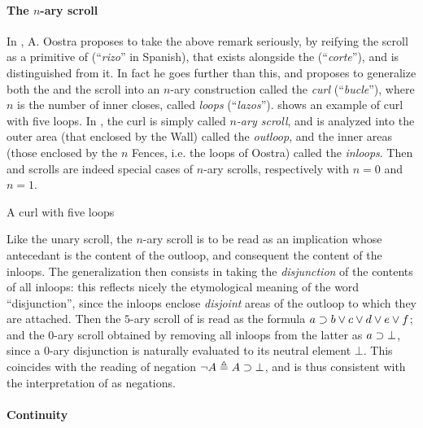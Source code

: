 \paragraph{The $n$-ary scroll}

In \cite{oostra_graficos_2010}, A. Oostra proposes to take the above remark
seriously, by reifying the scroll as a primitive  of  (``\emph{rizo}'' in
Spanish), that exists alongside the  (``\emph{corte}''), and is distinguished
from it. In fact he goes further than this, and proposes to generalize both the
 and the scroll into an $n$-ary construction called the \emph{curl}
(``\emph{bucle}''), where $n$ is the number of inner closes, called \emph{loops}
(``\emph{lazos}'').  shows an example of curl with five
loops. In \cite{minghui_graphical_2019}, the curl is simply called \emph{$n$-ary
scroll}, and is analyzed into the outer area (that enclosed by the Wall) called
the \emph{outloop}, and the inner areas (those enclosed by the $n$ Fences, i.e.
the loops of Oostra) called the \emph{inloops}. Then  and scrolls are indeed
special cases of $n$-ary scrolls, respectively with $n = 0$ and $n = 1$.

\begin{marginfigure}
  \caption{A curl with five loops}
\end{marginfigure}

Like the unary scroll, the $n$-ary scroll is to be read as an implication whose
antecedant is the content of the outloop, and consequent the content of the
inloops. The generalization then consists in taking the \emph{disjunction} of
the contents of all inloops: this reflects nicely the etymological meaning of
the word ``disjunction'', since the inloops enclose \emph{disjoint} areas of the
outloop to which they are attached. Then the $5$-ary scroll of
 is read as the formula $a \supset b \lor c \lor d \lor e \lor
f$; and the $0$-ary scroll obtained by removing all inloops from the latter as
$a \supset \bot$, since a $0$-ary disjunction is naturally evaluated to its
neutral element $\bot$. This coincides with the  reading of
negation $\neg A \triangleq A \supset \bot$, and is thus consistent with the
interpretation of  as negations.

\paragraph{Continuity}

